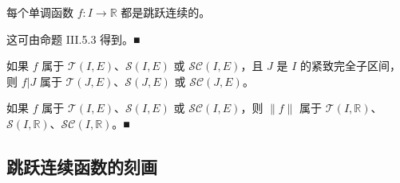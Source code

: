 \begin{remark}
\begin{items}
每个单调函数 $ f : I \to \mathbb{R} $ 都是跳跃连续的。

\proofhead
这可由命题 III.5.3 得到。\nobreak\hspace{0.35em}■
\item

如果 $ f $ 属于 $ \mathcal{T}(I, E) $、$ \mathcal{S}(I, E) $ 或 $ \mathcal{SC}(I, E) $，且 $ J $ 是 $ I $ 的紧致完全子区间，则 $ f|J $ 属于 $ \mathcal{T}(J, E) $、$ \mathcal{S}(J, E) $ 或 $ \mathcal{SC}(J, E) $。

\item

如果 $ f $ 属于 $ \mathcal{T}(I, E) $、$ \mathcal{S}(I, E) $ 或 $ \mathcal{SC}(I, E) $，则 $ \|f\| $ 属于 $ \mathcal{T}(I, \mathbb{R}) $、$ \mathcal{S}(I, \mathbb{R}) $、$ \mathcal{SC}(I, \mathbb{R}) $。\nobreak\hspace{0.35em}■

\end{items}

\end{remark}

\subsection*{跳跃连续函数的刻画}

